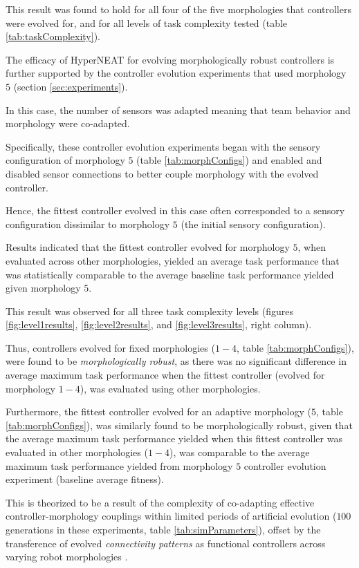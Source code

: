 This result was found to hold for all four of the five morphologies that controllers were evolved for,
and for all levels of task complexity tested (table \ref{tab:taskComplexity}).

The efficacy of HyperNEAT for evolving morphologically robust controllers is further supported
by the controller evolution experiments that used morphology $5$ (section \ref{sec:experiments}).

In this case, the number of sensors was adapted meaning that team behavior and
morphology were co-adapted.

Specifically, these controller evolution experiments began with the sensory configuration of
morphology $5$ (table \ref{tab:morphConfigs}) and enabled and disabled sensor connections to
better couple morphology with the evolved controller.  

Hence, the fittest controller evolved in this case often corresponded to a sensory configuration
dissimilar to morphology $5$ (the initial sensory configuration).

Results indicated that the fittest controller evolved for morphology $5$, when evaluated across
other morphologies, yielded an average task performance that was statistically comparable to
the average baseline task performance yielded given morphology $5$.

This result was observed for all three task complexity levels
(figures \ref{fig:level1results}, \ref{fig:level2results}, and \ref{fig:level3results}, right column).

Thus, controllers evolved for fixed morphologies ($1-4$, table \ref{tab:morphConfigs}), were
found to be \textit{morphologically robust}, as there was no significant difference in average maximum
task performance when the fittest controller (evolved for morphology $1-4$), was evaluated using other
morphologies.

Furthermore, the fittest controller evolved for an adaptive morphology ($5$, table \ref{tab:morphConfigs}),
was similarly found to be morphologically robust, given that the average maximum task performance
yielded when this fittest controller was evaluated in other morphologies ($1-4$), was comparable to
the average maximum task performance yielded from morphology $5$ controller evolution experiment (baseline average fitness).

This is theorized to be a result of the complexity of co-adapting effective controller-morphology
couplings \cite{PfeiferBongard2006} within limited periods of artificial evolution ($100$ generations in these experiments,
table \ref{tab:simParameters}), offset by the transference of evolved
\textit{connectivity patterns} \cite{GauciStanley2010} as functional controllers across varying
robot morphologies  \cite{RisiStanley2013}.

